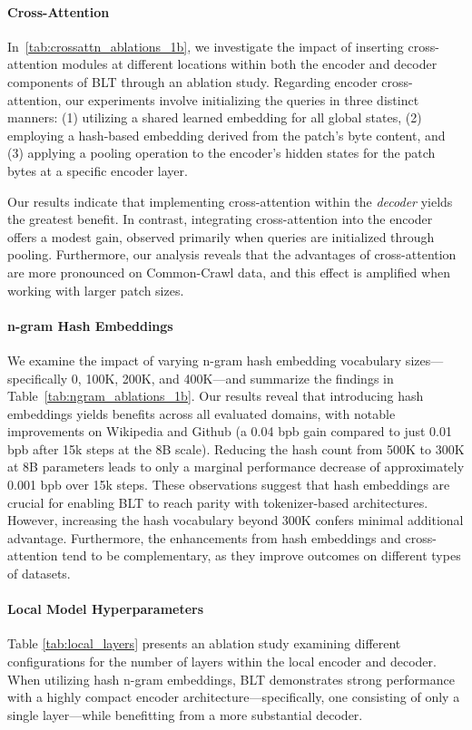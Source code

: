 \paragraph{Cross-Attention}
In~\autoref{tab:crossattn_ablations_1b}, we investigate the impact of inserting cross-attention modules at different locations within both the encoder and decoder components of {\textsc BLT} through an ablation study. Regarding encoder cross-attention, our experiments involve initializing the queries in three distinct manners: (1) utilizing a shared learned embedding for all global states, (2) employing a hash-based embedding derived from the patch’s byte content, and (3) applying a pooling operation to the encoder’s hidden states for the patch bytes at a specific encoder layer.

Our results indicate that implementing cross-attention within the \textit{decoder} yields the greatest benefit. In contrast, integrating cross-attention into the encoder offers a modest gain, observed primarily when queries are initialized through pooling. Furthermore, our analysis reveals that the advantages of cross-attention are more pronounced on Common-Crawl data, and this effect is amplified when working with larger patch sizes.

\paragraph{n-gram Hash Embeddings} 

We examine the impact of varying n-gram hash embedding vocabulary sizes—specifically 0, 100K, 200K, and 400K—and summarize the findings in Table~\ref{tab:ngram_ablations_1b}. Our results reveal that introducing hash embeddings yields benefits across all evaluated domains, with notable improvements on Wikipedia and Github (a 0.04 bpb gain compared to just 0.01 bpb after 15k steps at the 8B scale). Reducing the hash count from 500K to 300K at 8B parameters leads to only a marginal performance decrease of approximately 0.001 bpb over 15k steps. These observations suggest that hash embeddings are crucial for enabling {\textsc BLT} to reach parity with tokenizer-based architectures. However, increasing the hash vocabulary beyond 300K confers minimal additional advantage. Furthermore, the enhancements from hash embeddings and cross-attention tend to be complementary, as they improve outcomes on different types of datasets.

\paragraph{Local Model Hyperparameters} Table \ref{tab:local_layers} presents an ablation study examining different configurations for the number of layers within the local encoder and decoder. When utilizing hash n-gram embeddings, {\textsc BLT} demonstrates strong performance with a highly compact encoder architecture—specifically, one consisting of only a single layer—while benefitting from a more substantial decoder.

